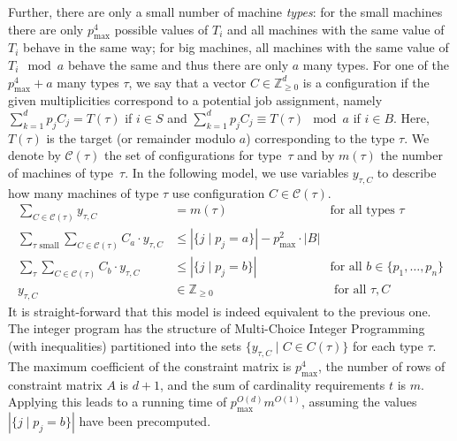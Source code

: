 \documentclass{article}
\newcommand{\Z}{\mathbb{Z}}
\newcommand{\ZZ}{\Z_{\ge 0}}
\begin{document}
Further, there are only a small number of machine \emph{types}:
for the small machines there are only $p_{\max}^4$ possible values of $T_i$ and all machines
with the same value of $T_i$ behave in the same way; for big machines, all machines with the
same value of $T_i \mod a$ behave the same and thus there are only $a$ many types.
For one of the $p_{\max}^4 + a$ many types $\tau$, we say that
a vector $C\in \ZZ^d$ is a configuration
if the given multiplicities correspond to a potential job assignment, namely
$\sum_{k = 1}^d p_j C_j = T(\tau)$ if $i\in S$ and $\sum_{k = 1}^d p_j C_j \equiv T(\tau) \mod a$ if $i\in B$. Here, $T(\tau)$ is the target (or remainder modulo $a$) corresponding to the type $\tau$.
We denote by $\mathcal C(\tau)$ the set of configurations for type~$\tau$ and by $m(\tau)$ the number of
machines of type~$\tau$. In the following model, we use variables $y_{\tau, C}$ to describe how
many machines of type $\tau$ use configuration $C\in\mathcal C(\tau)$.
\begin{align*}
	\sum_{C\in \mathcal C(\tau)} y_{\tau, C} &= m(\tau) &\text{for all types } \tau \\
	\sum_{\tau \text{ small}}\sum_{C\in \mathcal C(\tau)} C_a \cdot y_{\tau, C} &\le |\{j\mid p_j = a\}| - p^2_{\max} \cdot |B| & \\
	\sum_{\tau}\sum_{C\in \mathcal C(\tau)} C_b \cdot y_{\tau, C} &\le |\{j\mid p_j = b\}| &\text{for all } b\in \{p_1,\dotsc,p_n\} \\
	y_{\tau, C} &\in \ZZ &\text{ for all } \tau, C
\end{align*}
It is straight-forward that this model is indeed equivalent to the previous one.
The integer program has the structure of Multi-Choice Integer Programming (with inequalities) partitioned into
the sets
$\{y_{\tau, C} \mid C\in C(\tau)\}$ for each type $\tau$.
The maximum coefficient of the constraint matrix is $p_{\max}^4$, the number of rows of constraint matrix $A$
is $d + 1$, and the sum of cardinality requirements $t$ is $m$.
Applying  this leads to a running time of $p_{\max}^{O(d)} m^{O(1)}$, assuming
the values $|\{j\mid p_j = b\}|$ have been precomputed.
\end{document}
